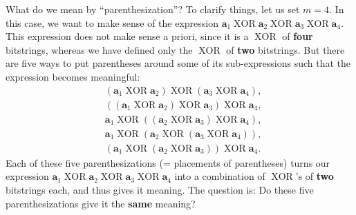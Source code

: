 \documentclass[numbers=enddot,12pt,final,onecolumn,notitlepage]{scrartcl}%
\numberwithin{exer}{subsection}
\theoremstyle{definition}
\begin{document}
What do we mean by \textquotedblleft parenthesization\textquotedblright? To
clarify things, let us set $m=4$. In this case, we want to make sense of the
expression $\mathbf{a}_{1}\operatorname*{XOR}\mathbf{a}_{2}\operatorname*{XOR}%
\mathbf{a}_{3}\operatorname*{XOR}\mathbf{a}_{4}$. This expression does not
make sense a priori, since it is a $\operatorname*{XOR}$ of \textbf{four}
bitstrings, whereas we have defined only the $\operatorname*{XOR}$ of
\textbf{two} bitstrings. But there are five ways to put parentheses around
some of its sub-expressions such that the expression becomes meaningful:
\begin{align*}
&  \left(  \mathbf{a}_{1}\operatorname*{XOR}\mathbf{a}_{2}\right)
\operatorname*{XOR}\left(  \mathbf{a}_{3}\operatorname*{XOR}\mathbf{a}%
_{4}\right)  ,\\
&  \left(  \left(  \mathbf{a}_{1}\operatorname*{XOR}\mathbf{a}_{2}\right)
\operatorname*{XOR}\mathbf{a}_{3}\right)  \operatorname*{XOR}\mathbf{a}_{4},\\
&  \mathbf{a}_{1}\operatorname*{XOR}\left(  \left(  \mathbf{a}_{2}%
\operatorname*{XOR}\mathbf{a}_{3}\right)  \operatorname*{XOR}\mathbf{a}%
_{4}\right)  ,\\
&  \mathbf{a}_{1}\operatorname*{XOR}\left(  \mathbf{a}_{2}\operatorname*{XOR}%
\left(  \mathbf{a}_{3}\operatorname*{XOR}\mathbf{a}_{4}\right)  \right)  ,\\
&  \left(  \mathbf{a}_{1}\operatorname*{XOR}\left(  \mathbf{a}_{2}%
\operatorname*{XOR}\mathbf{a}_{3}\right)  \right)  \operatorname*{XOR}%
\mathbf{a}_{4}.
\end{align*}
Each of these five parenthesizations (= placements of parentheses) turns our
expression $\mathbf{a}_{1}\operatorname*{XOR}\mathbf{a}_{2}\operatorname*{XOR}%
\mathbf{a}_{3}\operatorname*{XOR}\mathbf{a}_{4}$ into a combination of
$\operatorname*{XOR}$'s of \textbf{two} bitstrings each, and thus gives it
meaning. The question is: Do these five parenthesizations give it the
\textbf{same} meaning?
\end{document}
